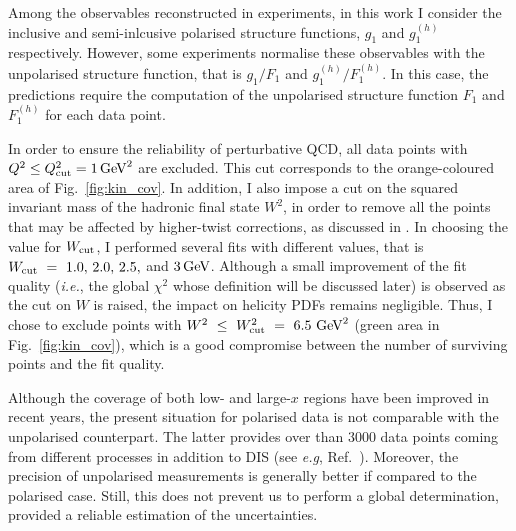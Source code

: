 Among the observables reconstructed in experiments, in this work I consider the inclusive and semi-inlcusive polarised structure functions, $g_1$ and $g_1^{(h)}$ respectively. However, some experiments normalise these observables with the unpolarised structure function, that is $g_1/F_1$ and $g_1^{(h)}/F_1^{(h)}$. In this case, the predictions require the computation of the unpolarised structure function $F_1$ and $F_1^{(h)}$ for each data point. %

In order to ensure the reliability of perturbative QCD, all data points with $Q^2 \leq Q^2_{\textrm{cut}} = 1 \, \textrm{GeV}^2$ are excluded. This cut corresponds to the orange-coloured area of Fig.~\ref{fig:kin_cov}. In addition, I also impose a cut on the squared invariant mass of the hadronic final state $W^2$, in order to remove all the points that may be affected by higher-twist corrections, as discussed in . In choosing the value for $W_{\textrm{cut}}$, I performed several fits with different values, that is $W_{\textrm{cut}}~=~1.0, \, 2.0, \, 2.5,$ and $3 \, \textrm{GeV}$. Although a small improvement of the fit quality (\textit{i.e.}, the global $\chi^2$ whose definition will be discussed later) is observed as the cut on $W$ is raised, the impact on helicity PDFs remains negligible. Thus, I chose to exclude points with $W^2~\leq~W^2_{\textrm{cut}}~=~6.5~\textrm{GeV}^2$ (green area in Fig.~\ref{fig:kin_cov}), which is a good compromise between the number of surviving points and the fit quality.%


Although the coverage of both low- and large-$x$ regions have been improved in recent years, the present situation for polarised data is not comparable with the unpolarised counterpart. The latter provides over than $3000$ data points coming from different processes in addition to DIS (see \textit{e.g}, Ref.~\cite{Kassabov:2022pps}). Moreover, the precision of unpolarised measurements is generally better if compared to the polarised case. Still, this does not prevent us to perform a global determination, provided a reliable estimation of the uncertainties.%

